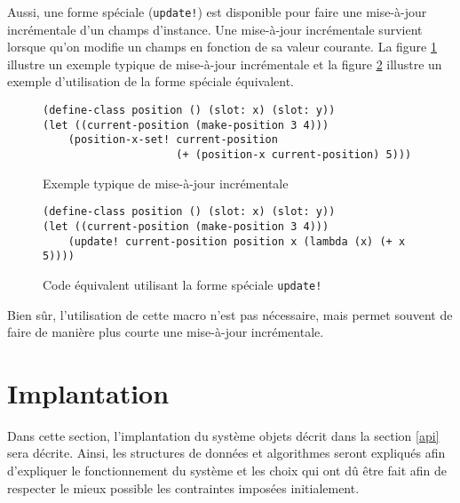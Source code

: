       Aussi, une forme spéciale (\texttt{update!}) est disponible pour
      faire une mise-à-jour incrémentale d'un champs d'instance. Une
      mise-à-jour incrémentale survient lorsque qu'on modifie un
      champs en fonction de sa valeur courante. La figure
      \ref{ex-update-a} illustre un exemple typique de mise-à-jour
      incrémentale et la figure \ref{ex-update-b} illustre un exemple
      d'utilisation de la forme spéciale équivalent.

      \begin{figure}[h!]
          \begin{lstlisting}
(define-class position () (slot: x) (slot: y))
(let ((current-position (make-position 3 4)))
    (position-x-set! current-position
                     (+ (position-x current-position) 5)))
          \end{lstlisting}
          \caption{Exemple typique de mise-à-jour incrémentale}
          \label{ex-update-a}
      \end{figure}

      \begin{figure}[h!]
          \begin{lstlisting}
(define-class position () (slot: x) (slot: y))
(let ((current-position (make-position 3 4)))
    (update! current-position position x (lambda (x) (+ x 5))))
          \end{lstlisting}
          \caption{Code équivalent utilisant la forme spéciale
            \texttt{update!}}
          \label{ex-update-b}
      \end{figure}

    Bien sûr, l'utilisation de cette macro n'est pas nécessaire, mais
    permet souvent de faire de manière plus courte une mise-à-jour
    incrémentale.




\section{Implantation}

  Dans cette section, l'implantation du système objets décrit dans la
  section \ref{api} sera décrite. Ainsi, les structures de données et
  algorithmes seront expliqués afin d'expliquer le fonctionnement du
  système et les choix qui ont dû être fait afin de respecter le
  mieux possible les contraintes imposées initialement.

